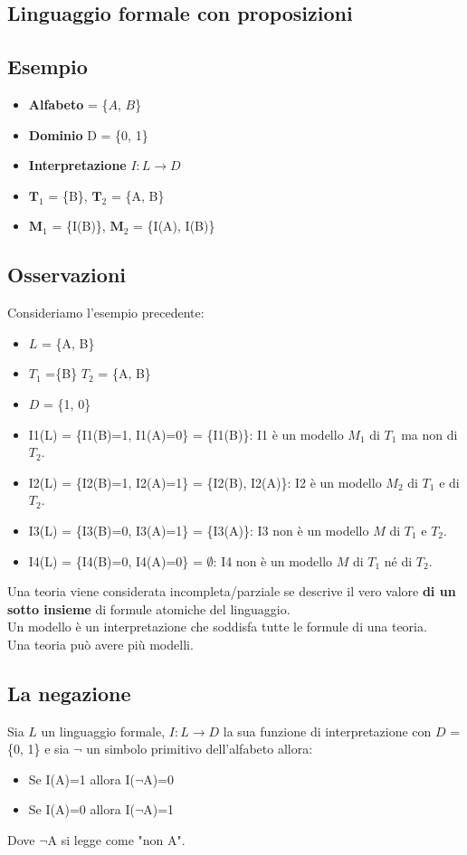 \documentclass[../main.tex]{subfiles}
\begin{document}
    \subsection{Linguaggio formale con proposizioni}
    \subsection{Esempio}
    \begin{itemize}
        \item \textbf{Alfabeto} = \{$A$, $B$\}
        \item \textbf{Dominio} D = \{0, 1\}
        \item \textbf{Interpretazione} $I:L \to D$
        \item $\textbf{T}_1$ = \{B\}, $\textbf{T}_2$ = \{A, B\}
        \item $\textbf{M}_1$ = \{I(B)\}, $\textbf{M}_2$ = \{I(A), I(B)\}
    \end{itemize}

    \subsection{Osservazioni}
    Consideriamo l'esempio precedente:
    \begin{itemize}
        \item $L$ = \{A, B\}
        \item $T_1$ =\{B\} $T_2$ = \{A, B\}
        \item $D$ = \{1, 0\}
        \item I1(L) = \{I1(B)=1, I1(A)=0\} = \{I1(B)\}: I1 è un modello $M_1$ di $T_1$ ma non di $T_2$.
        \item I2(L) = \{I2(B)=1, I2(A)=1\} = \{I2(B), I2(A)\}: I2 è un modello $M_2$ di $T_1$ e di $T_2$.
        \item I3(L) = \{I3(B)=0, I3(A)=1\} = \{I3(A)\}: I3 non è un modello $M$ di $T_1$ e $T_2$.
        \item I4(L) = \{I4(B)=0, I4(A)=0\} = $\emptyset$: I4 non è un modello $M$ di $T_1$ né di $T_2$.
    \end{itemize}
    Una teoria viene considerata incompleta/parziale se descrive il vero valore \textbf{di un sotto insieme} di formule atomiche del linguaggio.\\
    Un modello è un interpretazione che soddisfa tutte le formule di una teoria.\\
    Una teoria può avere più modelli.

    \subsection{La negazione}
    Sia $L$ un linguaggio formale, $I:L \to D$ la sua funzione di interpretazione con $D$ = \{0, 1\} e sia $\lnot$ un simbolo primitivo dell'alfabeto allora:
    \begin{itemize}
        \item Se I(A)=1 allora I($\lnot$A)=0
        \item Se I(A)=0 allora I($\lnot$A)=1
    \end{itemize}
    Dove $\lnot$A si legge come "non A".
\end{document}
